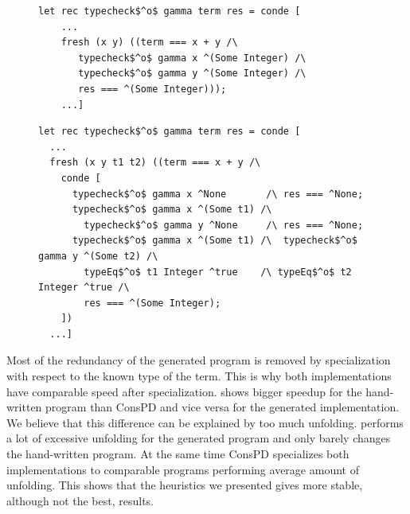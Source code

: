 \begin{figure}[!t]
  \centering
  \begin{minipage}{0.95\textwidth}
    \begin{lstlisting}[label={type:hand}, caption={A fragment of hand-written typechecker}, captionpos=b, frame=tb]
  let rec typecheck$^o$ gamma term res = conde [
    ...
    fresh (x y) ((term === x + y /\
       typecheck$^o$ gamma x ^(Some Integer) /\
       typecheck$^o$ gamma y ^(Some Integer) /\
       res === ^(Some Integer)));
    ...]
    \end{lstlisting}
  \end{minipage}

  \begin{minipage}{0.95\textwidth}
    \begin{lstlisting}[label={type:gen}, caption={A fragment of generated typechecker}, captionpos=b, frame=tb]
let rec typecheck$^o$ gamma term res = conde [
  ...
  fresh (x y t1 t2) ((term === x + y /\
    conde [
      typecheck$^o$ gamma x ^None       /\ res === ^None;
      typecheck$^o$ gamma x ^(Some t1) /\
        typecheck$^o$ gamma y ^None     /\ res === ^None;
      typecheck$^o$ gamma x ^(Some t1) /\  typecheck$^o$ gamma y ^(Some t2) /\
        typeEq$^o$ t1 Integer ^true    /\ typeEq$^o$ t2 Integer ^true /\
        res === ^(Some Integer);
    ])
  ...]
    \end{lstlisting}
  \end{minipage}
\end{figure}

Most of the redundancy of the generated program is removed by specialization with respect to the known type of the term.
This is why both implementations have comparable speed after specialization.
\ecce shows bigger speedup for the hand-written program than ConsPD and vice versa for the generated implementation.
We believe that this difference can be explained by too much unfolding.
\ecce performs a lot of excessive unfolding for the generated program and only barely changes the hand-written program.
At the same time ConsPD specializes both implementations to comparable programs performing average amount of unfolding.
This shows that the heuristics we presented gives more stable, although not the best, results.



